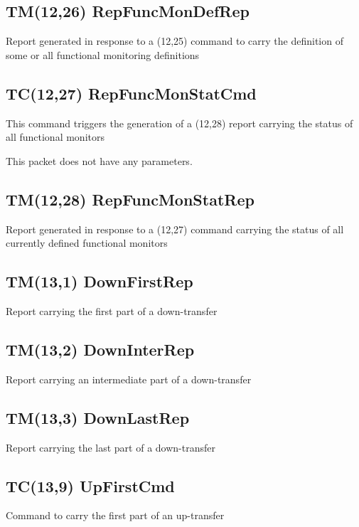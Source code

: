 \pagebreak
\subsection{TM(12,26) RepFuncMonDefRep}
Report generated in response to a (12,25) command to carry the definition of some or all functional monitoring definitions

\pagebreak
\subsection{TC(12,27) RepFuncMonStatCmd}
This command triggers the generation of a (12,28) report carrying the status of all functional monitors

This packet does not have any parameters.

\pagebreak
\subsection{TM(12,28) RepFuncMonStatRep}
Report generated in response to a (12,27) command carrying the status of all currently defined functional monitors

\pagebreak
\subsection{TM(13,1) DownFirstRep}
Report carrying the first part of a down-transfer

\pagebreak
\subsection{TM(13,2) DownInterRep}
Report carrying an intermediate part of a down-transfer

\pagebreak
\subsection{TM(13,3) DownLastRep}
Report carrying the last part of a down-transfer

\pagebreak
\subsection{TC(13,9) UpFirstCmd}
Command to carry the first part of an up-transfer

